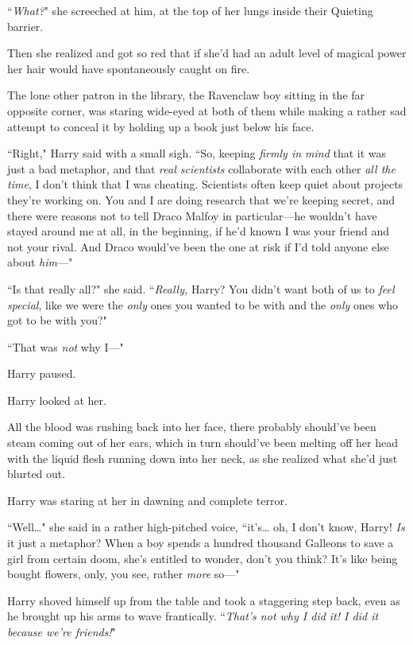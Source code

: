``\emph{What?}" she screeched at him, at the top of her lungs inside their Quieting barrier.

Then she realized and got so red that if she'd had an adult level of magical power her hair would have spontaneously caught on fire.

The lone other patron in the library, the Ravenclaw boy sitting in the far opposite corner, was staring wide-eyed at both of them while making a rather sad attempt to conceal it by holding up a book just below his face.

``Right," Harry said with a small sigh. ``So, keeping \emph{firmly in mind} that it was just a bad metaphor, and that \emph{real scientists} collaborate with each other \emph{all the time}, I don't think that I was cheating. Scientists often keep quiet about projects they're working on. You and I are doing research that we're keeping secret, and there were reasons not to tell Draco Malfoy in particular—he wouldn't have stayed around me at all, in the beginning, if he'd known I was your friend and not your rival. And Draco would've been the one at risk if I'd told anyone else about \emph{him}—"

``Is that really all?" she said. ``\emph{Really,} Harry? You didn't want both of us to \emph{feel special}, like we were the \emph{only} ones you wanted to be with and the \emph{only} ones who got to be with you?"

``That was \emph{not} why I—"

Harry paused.

Harry looked at her.

All the blood was rushing back into her face, there probably should've been steam coming out of her ears, which in turn should've been melting off her head with the liquid flesh running down into her neck, as she realized what she'd just blurted out.

Harry was staring at her in dawning and complete terror.

``Well{\ldots}" she said in a rather high-pitched voice, ``it's{\ldots} oh, I don't know, Harry! \emph{Is} it just a metaphor? When a boy spends a hundred thousand Galleons to save a girl from certain doom, she's entitled to wonder, don't you think? It's like being bought flowers, only, you see, rather \emph{more} so—"

Harry shoved himself up from the table and took a staggering step back, even as he brought up his arms to wave frantically. ``\emph{That's not why I did it! I did it because we're friends!}"

